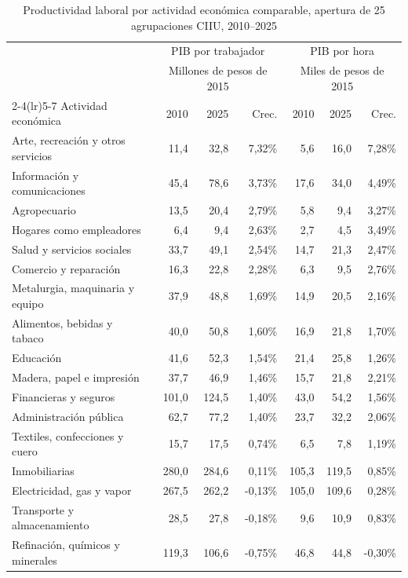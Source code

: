 \begin{table}[H]
\centering
\caption{Productividad laboral por actividad económica comparable, apertura de 25 agrupaciones CIIU, 2010--2025}
\label{tab:pib_geih_productividad_25}
\footnotesize
\begin{tabular}{p{}rrrrrr}
\toprule
& \multicolumn{3}{c}{PIB por trabajador} & \multicolumn{3}{c}{PIB por hora} \\
& \multicolumn{3}{c}{\footnotesize Millones de pesos de 2015} & \multicolumn{3}{c}{\footnotesize Miles de pesos de 2015} \\
\cmidrule(lr){2-4}\cmidrule(lr){5-7}
Actividad económica & 2010 & 2025 & Crec. & 2010 & 2025 & Crec. \\
\midrule
Arte, recreación y otros servicios & 11,4 & 32,8 & 7,32\% & 5,6 & 16,0 & 7,28\% \\
Información y comunicaciones & 45,4 & 78,6 & 3,73\% & 17,6 & 34,0 & 4,49\% \\
Agropecuario & 13,5 & 20,4 & 2,79\% & 5,8 & 9,4 & 3,27\% \\
Hogares como empleadores & 6,4 & 9,4 & 2,63\% & 2,7 & 4,5 & 3,49\% \\
Salud y servicios sociales & 33,7 & 49,1 & 2,54\% & 14,7 & 21,3 & 2,47\% \\
Comercio y reparación & 16,3 & 22,8 & 2,28\% & 6,3 & 9,5 & 2,76\% \\
Metalurgia, maquinaria y equipo & 37,9 & 48,8 & 1,69\% & 14,9 & 20,5 & 2,16\% \\
Alimentos, bebidas y tabaco & 40,0 & 50,8 & 1,60\% & 16,9 & 21,8 & 1,70\% \\
Educación & 41,6 & 52,3 & 1,54\% & 21,4 & 25,8 & 1,26\% \\
Madera, papel e impresión & 37,7 & 46,9 & 1,46\% & 15,7 & 21,8 & 2,21\% \\
Financieras y seguros & 101,0 & 124,5 & 1,40\% & 43,0 & 54,2 & 1,56\% \\
Administración pública & 62,7 & 77,2 & 1,40\% & 23,7 & 32,2 & 2,06\% \\
Textiles, confecciones y cuero & 15,7 & 17,5 & 0,74\% & 6,5 & 7,8 & 1,19\% \\
Inmobiliarias & 280,0 & 284,6 & 0,11\% & 105,3 & 119,5 & 0,85\% \\
Electricidad, gas y vapor & 267,5 & 262,2 & -0,13\% & 105,0 & 109,6 & 0,28\% \\
Transporte y almacenamiento & 28,5 & 27,8 & -0,18\% & 9,6 & 10,9 & 0,83\% \\
Refinación, químicos y minerales & 119,3 & 106,6 & -0,75\% & 46,8 & 44,8 & -0,30\% \\

\end{tabular}
\end{table}
